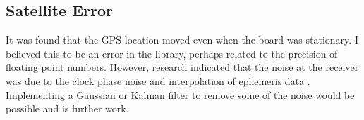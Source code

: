 \documentclass[12pt,a4paper]{report}
\begin{document}
\subsection{Satellite Error}
It was found that the GPS location moved even when the board was stationary. I believed this to be an error in the library, perhaps related to the precision of floating point numbers. However, research indicated that the noise at the receiver was due to the clock phase noise and interpolation of ephemeris data \cite{satellite}. Implementing a Gaussian or Kalman filter to remove some of the noise would be possible and is further work. %
 
 
\end{document}
